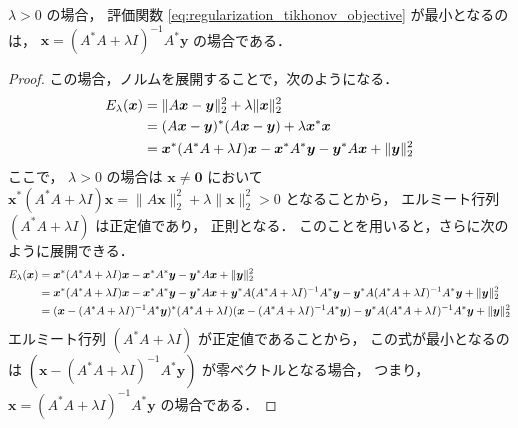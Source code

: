 \begin{theorem}\label{theorem:regularization_tikhonov_solution}
    $\lambda > 0$ の場合，
    評価関数 \eqref{eq:regularization_tikhonov_objective} が最小となるのは，
    $\bm{x} = (A^* A + \lambda I)^{-1} A^* \bm{y}$ の場合である．
\end{theorem}
\begin{proof}
    この場合，ノルムを展開することで，次のようになる．
    \begin{align}
        E_{\lambda}(\bm{x})
         & = \|A \bm{x} - \bm{y}\|_2^2 + \lambda \|\bm{x}\|_2^2
        \notag                                                                                              \\
         & = (A \bm{x} - \bm{y})^* (A \bm{x} - \bm{y}) + \lambda \bm{x}^* \bm{x}
        \notag                                                                                              \\
         & = \bm{x}^* (A^* A + \lambda I) \bm{x} - \bm{x}^* A^* \bm{y} - \bm{y}^* A \bm{x} + \|\bm{y}\|_2^2
    \end{align}
    ここで，
    $\lambda > 0$ の場合は
    $\bm{x} \neq \bm{0}$ において
    $\bm{x}^* (A^* A + \lambda I) \bm{x} = \|A \bm{x}\|_2^2 + \lambda \|\bm{x}\|_2^2 > 0$
    となることから，
    エルミート行列 $(A^* A + \lambda I)$ は正定値であり，
    正則となる．
    このことを用いると，さらに次のように展開できる．
    \begin{align}
        E_{\lambda}(\bm{x})
         & = \bm{x}^* (A^* A + \lambda I) \bm{x} - \bm{x}^* A^* \bm{y} - \bm{y}^* A \bm{x} + \|\bm{y}\|_2^2
        \notag                                                                                              \\
         & = \bm{x}^* (A^* A + \lambda I) \bm{x} - \bm{x}^* A^* \bm{y} - \bm{y}^* A \bm{x}
        + \bm{y}^* A (A^* A + \lambda I)^{-1} A^* \bm{y}
        - \bm{y}^* A (A^* A + \lambda I)^{-1} A^* \bm{y}
        + \|\bm{y}\|_2^2
        \notag                                                                                              \\
         & = (\bm{x} - (A^* A + \lambda I)^{-1} A^* \bm{y})^*
        (A^* A + \lambda I)
        (\bm{x} - (A^* A + \lambda I)^{-1} A^* \bm{y})
        - \bm{y}^* A (A^* A + \lambda I)^{-1} A^* \bm{y}
        + \|\bm{y}\|_2^2
    \end{align}
    エルミート行列 $(A^* A + \lambda I)$ が正定値であることから，
    この式が最小となるのは
    $(\bm{x} - (A^* A + \lambda I)^{-1} A^* \bm{y})$
    が零ベクトルとなる場合，
    つまり，
    $\bm{x} = (A^* A + \lambda I)^{-1} A^* \bm{y}$
    の場合である．
\end{proof}

